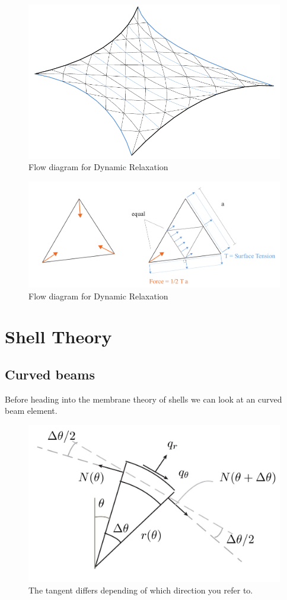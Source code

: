 \begin{figure}[H]
\centering
\includegraphics[width=0.9\linewidth ]{figure/Theory/EqualMeshGeo.pdf}
\caption{Flow diagram for Dynamic Relaxation }
\end{figure}


\begin{figure}[H]
\centering
\includegraphics[width=1.0\linewidth ]{figure/Theory/SoapbubbleElement.pdf}
\caption{Flow diagram for Dynamic Relaxation }
\end{figure}


\section{Shell Theory}




\subsection{Curved beams}

Before heading into the membrane theory of shells we can look at an curved beam element.

\begin{figure}[H]
\centering
\includegraphics[height=0.5\linewidth ]{figure/Theory/CurvedBeam.JPG}
\caption{The tangent differs depending of which direction you refer to. }
\end{figure}
